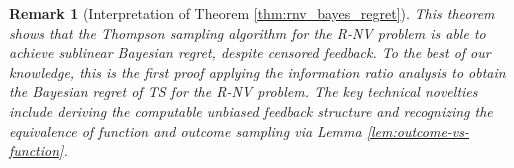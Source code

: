 \documentclass[11pt]{article}
\newtheorem{remark}{Remark}
\begin{document}
\begin{remark}[Interpretation of Theorem \ref{thm:rnv_bayes_regret}]
This theorem shows that the Thompson sampling algorithm for the R-NV problem is able to achieve sublinear Bayesian regret, despite censored feedback. To the best of our knowledge, this is the first proof applying the information ratio analysis \cite{russo2016info} to obtain the Bayesian regret of TS for the R-NV problem. The key technical novelties include deriving the computable unbiased feedback structure and recognizing the equivalence of function and outcome sampling via Lemma \ref{lem:outcome-vs-function}. 
\end{remark}
\end{document}
